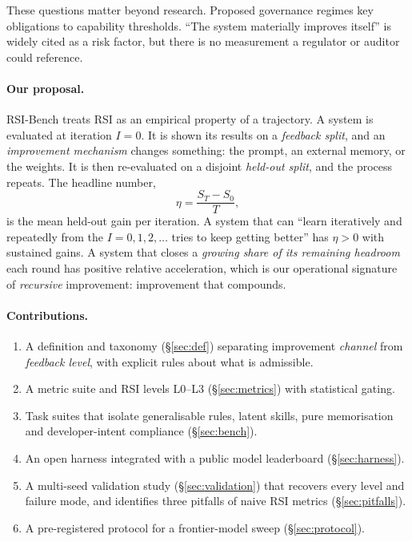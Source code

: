 \documentclass[11pt]{article}
\begin{document}
These questions matter beyond research. Proposed governance regimes key obligations to capability thresholds. ``The system materially improves itself'' is widely cited as a risk factor, but there is no measurement a regulator or auditor could reference.

\paragraph{Our proposal.} RSI-Bench treats RSI as an empirical property of a trajectory. A system is evaluated at iteration $I=0$. It is shown its results on a \emph{feedback split}, and an \emph{improvement mechanism} changes something: the prompt, an external memory, or the weights. It is then re-evaluated on a disjoint \emph{held-out split}, and the process repeats. The headline number,
\[
\eta = \frac{S_T - S_0}{T},
\]
is the mean held-out gain per iteration. A system that can ``learn iteratively and repeatedly from the $I=0,1,2,\dots$ tries to keep getting better'' has $\eta > 0$ with sustained gains. A system that closes a \emph{growing share of its remaining headroom} each round has positive relative acceleration, which is our operational signature of \emph{recursive} improvement: improvement that compounds.

\paragraph{Contributions.}
\begin{enumerate}
  \item A definition and taxonomy (\S\ref{sec:def}) separating improvement \emph{channel} from \emph{feedback level}, with explicit rules about what is admissible.
  \item A metric suite and RSI levels L0--L3 (\S\ref{sec:metrics}) with statistical gating.
  \item Task suites that isolate generalisable rules, latent skills, pure memorisation and developer-intent compliance (\S\ref{sec:bench}).
  \item An open harness integrated with a public model leaderboard (\S\ref{sec:harness}).
  \item A multi-seed validation study (\S\ref{sec:validation}) that recovers every level and failure mode, and identifies three pitfalls of naive RSI metrics (\S\ref{sec:pitfalls}).
  \item A pre-registered protocol for a frontier-model sweep (\S\ref{sec:protocol}).
\end{enumerate}
\end{document}
